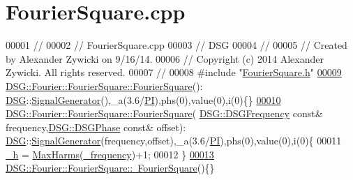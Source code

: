 \hypertarget{_fourier_square_8cpp_source}{\section{Fourier\+Square.\+cpp}
\label{_fourier_square_8cpp_source}
}

\begin{DoxyCode}
00001 \textcolor{comment}{//}
00002 \textcolor{comment}{//  FourierSquare.cpp}
00003 \textcolor{comment}{//  DSG}
00004 \textcolor{comment}{//}
00005 \textcolor{comment}{//  Created by Alexander Zywicki on 9/16/14.}
00006 \textcolor{comment}{//  Copyright (c) 2014 Alexander Zywicki. All rights reserved.}
00007 \textcolor{comment}{//}
00008 \textcolor{preprocessor}{#include "\hyperlink{_fourier_square_8h}{FourierSquare.h}"}
\hypertarget{_fourier_square_8cpp_source_l00009}{}\hyperlink{class_d_s_g_1_1_fourier_1_1_fourier_square_a48fa53b8b5ea77013e1bbb2b2467d15e}{00009} \hyperlink{class_d_s_g_1_1_fourier_1_1_fourier_square_a48fa53b8b5ea77013e1bbb2b2467d15e}{DSG::Fourier::FourierSquare::FourierSquare}():
      \hyperlink{namespace_d_s_g}{DSG}::\hyperlink{class_d_s_g_1_1_signal_generator}{SignalGenerator}(),\_a(3.6/\hyperlink{_p_i_8h_a598a3330b3c21701223ee0ca14316eca}{PI}),phs(0),value(0),i(0)\{\}
\hypertarget{_fourier_square_8cpp_source_l00010}{}\hyperlink{class_d_s_g_1_1_fourier_1_1_fourier_square_a277316295ca15354a6e507a71cb5f0db}{00010} \hyperlink{class_d_s_g_1_1_fourier_1_1_fourier_square_a48fa53b8b5ea77013e1bbb2b2467d15e}{DSG::Fourier::FourierSquare::FourierSquare}(
      \hyperlink{namespace_d_s_g_a4315a061386fa1014fda09b15d3a6973}{DSG::DSGFrequency} \textcolor{keyword}{const}& frequency,\hyperlink{namespace_d_s_g_a44431ce1eb0a7300efdd207bc879e52c}{DSG::DSGPhase} \textcolor{keyword}{const}& offset):
      \hyperlink{namespace_d_s_g}{DSG}::\hyperlink{class_d_s_g_1_1_signal_generator}{SignalGenerator}(frequency,offset),\_a(3.6/\hyperlink{_p_i_8h_a598a3330b3c21701223ee0ca14316eca}{PI}),phs(0),value(0),i(0)\{
00011     \hyperlink{class_d_s_g_1_1_fourier_1_1_fourier_square_ac482ccc644bac01f3491503a755b453c}{\_h} = \hyperlink{namespace_d_s_g_ab5c4eea42ea10b69cfc32afb83ff1d0d}{MaxHarms}(\hyperlink{class_d_s_g_1_1_signal_generator_a335e7ef058848eca368be51d8544d143}{\_frequency})+1;
00012 \}
\hypertarget{_fourier_square_8cpp_source_l00013}{}\hyperlink{class_d_s_g_1_1_fourier_1_1_fourier_square_af78565a799ebfd4be03cc0294dff1f85}{00013} \hyperlink{class_d_s_g_1_1_fourier_1_1_fourier_square_af78565a799ebfd4be03cc0294dff1f85}{DSG::Fourier::FourierSquare::~FourierSquare}()\{\}
\end{DoxyCode}

